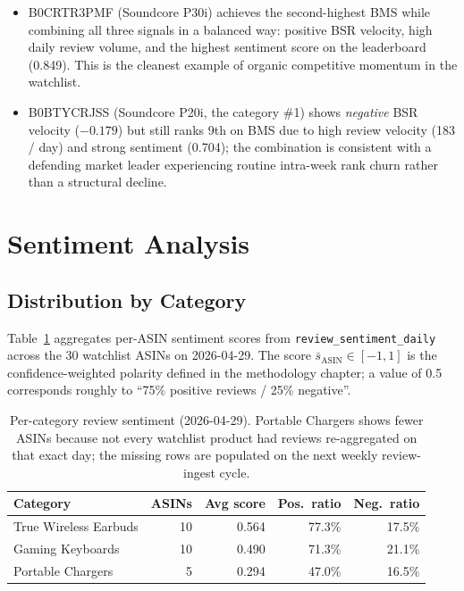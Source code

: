 \begin{itemize}
  \item B0CRTR3PMF (Soundcore P30i) achieves the second-highest BMS while
  combining all three signals in a balanced way: positive BSR velocity, high
  daily review volume, and the highest sentiment score on the leaderboard
  (0.849). This is the cleanest example of organic competitive momentum in
  the watchlist.
  \item B0BTYCRJSS (Soundcore P20i, the category \#1) shows
  \emph{negative} BSR velocity ($-0.179$) but still ranks 9th on BMS due to
  high review velocity (183 / day) and strong sentiment (0.704); the
  combination is consistent with a defending market leader experiencing
  routine intra-week rank churn rather than a structural decline.
\end{itemize}

\section{Sentiment Analysis}

\subsection{Distribution by Category}

Table~\ref{tab:sentiment_cat} aggregates per-ASIN sentiment scores from
\texttt{review\_sentiment\_daily} across the 30 watchlist ASINs on
2026-04-29. The score $\bar{s}_{\text{ASIN}} \in [-1, 1]$ is the
confidence-weighted polarity defined in the methodology chapter; a value of
0.5 corresponds roughly to ``75\% positive reviews / 25\% negative''.

\begin{table}[H]
  \centering
  \begin{tabular}{lrrrr}
    \toprule
    \textbf{Category} & \textbf{ASINs} & \textbf{Avg score} & \textbf{Pos.\ ratio} & \textbf{Neg.\ ratio} \\
    \midrule
    True Wireless Earbuds & 10 & 0.564 & 77.3\% & 17.5\% \\
    Gaming Keyboards      & 10 & 0.490 & 71.3\% & 21.1\% \\
    Portable Chargers     &  5 & 0.294 & 47.0\% & 16.5\% \\
    \bottomrule
  \end{tabular}
  \caption{Per-category review sentiment (2026-04-29). Portable Chargers
  shows fewer ASINs because not every watchlist product had reviews
  re-aggregated on that exact day; the missing rows are populated on the
  next weekly review-ingest cycle.}
  \label{tab:sentiment_cat}
\end{table}

